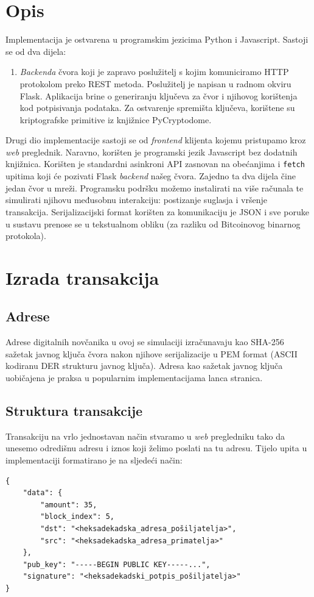 \documentclass[utf8, zavrsni]{fer}
\begin{document}
\section{Opis}
Implementacija je ostvarena u programskim jezicima Python i Javascript. Sastoji se od dva dijela:
\begin{enumerate}
    \item \textit{Backenda} čvora koji je zapravo poslužitelj s kojim komuniciramo HTTP protokolom preko REST metoda. Poslužitelj je napisan u radnom okviru Flask. Aplikacija brine o generiranju ključeva za čvor i njihovog korištenja kod potpisivanja podataka. Za ostvarenje spremišta ključeva, korištene su kriptografske primitive iz knjižnice PyCryptodome.
\end{enumerate}
Drugi dio implementacije sastoji se od \textit{frontend} klijenta kojemu pristupamo kroz \textit{web} preglednik. Naravno, korišten je programski jezik Javascript bez dodatnih knjižnica. Korišten je standardni asinkroni API zasnovan na obećanjima i \texttt{fetch} upitima koji će pozivati Flask \textit{backend} našeg čvora. Zajedno ta dva dijela čine jedan čvor u mreži. Programsku podršku možemo instalirati na više računala te simulirati njihovu međusobnu interakciju: postizanje suglasja i vršenje transakcija. Serijalizacijski format korišten za komunikaciju je JSON i sve poruke u sustavu prenose se u tekstualnom obliku (za razliku od Bitcoinovog binarnog protokola).

\section{Izrada transakcija}

\subsection{Adrese}
Adrese digitalnih novčanika u ovoj se simulaciji izračunavaju kao SHA-256 sažetak javnog ključa čvora nakon njihove serijalizacije u PEM format (ASCII kodiranu DER strukturu javnog ključa). Adresa kao sažetak javnog ključa uobičajena je praksa u popularnim implementacijama lanca stranica.

\subsection{Struktura transakcije}
Transakciju na vrlo jednostavan način stvaramo u \textit{web} pregledniku tako da unesemo odredišnu adresu i iznos koji želimo poslati na tu adresu. Tijelo upita u implementaciji formatirano je na sljedeći način:
\begin{verbatim}
{
	"data": {
		"amount": 35,
		"block_index": 5,
		"dst": "<heksadekadska_adresa_pošiljatelja>",
		"src": "<heksadekadska_adresa_primatelja>"
	},
	"pub_key": "-----BEGIN PUBLIC KEY-----...",
	"signature": "<heksadekadski_potpis_pošiljatelja>"
}
\end{verbatim}
\end{document}
